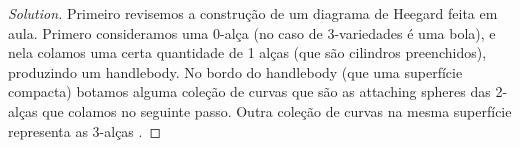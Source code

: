 \begin{proof}[Solution]\leavevmode
	Primeiro revisemos a construção de um diagrama de Heegard feita em aula. Primero consideramos uma 0-alça (no caso de 3-variedades é uma bola), e nela colamos uma certa quantidade de 1 alças (que são cilindros preenchidos), produzindo um handlebody. No bordo do handlebody (que uma superfície compacta) botamos alguma coleção de curvas que são as attaching spheres das 2-alças que colamos no seguinte passo. Outra coleção de curvas na mesma superfície representa as 3-alças .
\end{proof}


